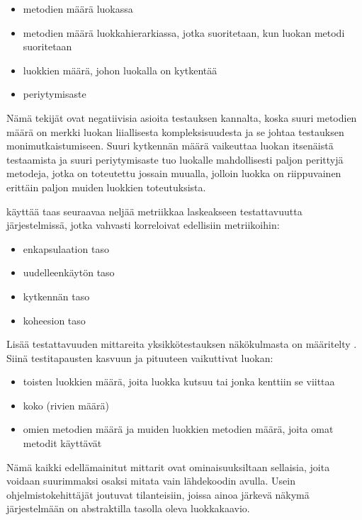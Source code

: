 \documentclass[finnish]{tktltiki2}
\theoremstyle{definition}
\theoremstyle{remark}
\begin{document}
\begin{itemize}
	\item metodien määrä luokassa
	\item metodien määrä luokkahierarkiassa, jotka suoritetaan, kun luokan metodi suoritetaan
	\item luokkien määrä, johon luokalla on kytkentää
	\item periytymisaste
\end{itemize}

\noindent
Nämä tekijät ovat negatiivisia asioita testauksen kannalta, koska suuri metodien määrä on merkki luokan liiallisesta kompleksisuudesta ja se johtaa testauksen monimutkaistumiseen. Suuri kytkennän määrä vaikeuttaa luokan itsenäistä testaamista ja suuri periytymisaste tuo luokalle mahdollisesti paljon perittyjä metodeja, jotka on toteutettu jossain muualla, jolloin luokka on riippuvainen erittäin paljon muiden luokkien toteutuksista. 

\citep[s. 3-4]{Khan:2009:MBT:1507195.1507204} käyttää taas seuraavaa neljää metriikkaa laskeakseen testattavuutta järjestelmissä, jotka vahvasti korreloivat edellisiin metriikoihin: 

\begin{itemize}
	\item enkapsulaation taso
	\item uudelleenkäytön taso
	\item kytkennän taso
	\item koheesion taso
\end{itemize}   


Lisää testattavuuden mittareita yksikkötestauksen näkökulmasta on määritelty \citep[s. 9]{Bruntink:2004}. Siinä testitapausten kasvuun ja pituuteen vaikuttivat luokan: 

\begin{itemize}
	\item toisten luokkien määrä, joita luokka kutsuu tai jonka kenttiin se viittaa
	\item koko (rivien määrä)
	\item omien metodien määrä ja muiden luokkien metodien määrä, joita omat metodit käyttävät
\end{itemize} 

Nämä kaikki edellämainitut mittarit ovat ominaisuuksiltaan sellaisia, joita voidaan suurimmaksi osaksi mitata vain lähdekoodin avulla. Usein ohjelmistokehittäjät joutuvat tilanteisiin, joissa ainoa järkevä näkymä järjestelmään on abstraktilla tasolla oleva luokkakaavio.
\end{document}
